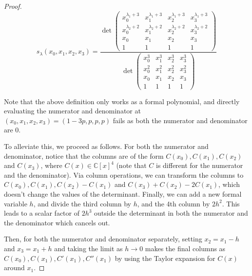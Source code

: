 \documentclass[11pt]{article}
\begin{document}
\begin{proof}
     \[s_\lambda(x_0,x_1,x_2,x_3)=\frac{\det\begin{pmatrix}
        x_0^{\lambda_1+3}&x_1^{\lambda_1+3}&x_2^{\lambda_1+3}&x_3^{\lambda_1+3}\\
        x_0^{\lambda_2+2}&x_1^{\lambda_2+2}&x_2^{\lambda_2+2}&x_3^{\lambda_2+2}\\
        x_0&x_1&x_2&x_3\\
        1&1&1&1
    \end{pmatrix}}{\det\begin{pmatrix}
        x_0^{3}&x_1^{3}&x_2^{3}&x_3^{3}\\
        x_0^{2}&x_1^{2}&x_2^{2}&x_3^{2}\\
        x_0&x_1&x_2&x_3\\
        1&1&1&1
    \end{pmatrix}}\]

Note that the above definition only works as a formal polynomial, and directly evaluating the numerator and denominator at $(x_0,x_1,x_2,x_3)=(1-3p,p,p,p)$ fails as both the numerator and denominator are 0. 

To alleviate this, we proceed as follows. For both the numerator and denominator, notice that the columns are of the form $C(x_0), C(x_1),C(x_2)$and $C(x_3)$, where $C(x)\in \mathbb C[x]^4$ (note that $C$ is different for the numerator and the denominator). Via column operations, we can transform the columns to $C(x_0),C(x_1), C(x_2)-C(x_1)$ and $C(x_3)+C(x_2)-2C(x_1)$, which doesn't change the values of the determinant. Finally, we can add a new formal variable $h$, and divide the third column by $h$, and the 4th column by $2h^2$. This leads to a scalar factor of $2h^3$ outside the determinant in both the numerator and the denominator which cancels out.

Then, for both the numerator and denominator separately, setting $x_2=x_1-h$ and $x_3=x_1+h$ and taking the limit as $h\to 0$ makes the final columns as $C(x_0),C(x_1),C'(x_1),C''(x_1)$ by using the Taylor expansion for $C(x)$ around $x_1$.


\end{proof}
\end{document}
